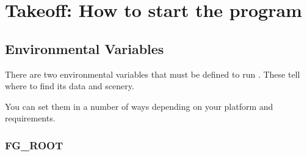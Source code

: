 
\chapter{Takeoff: How to start the program\label{takeoff}}


\section{Environmental Variables}

There are two environmental variables that must be defined to run \FlightGear{}.
These tell \FlightGear{} where to find its data and scenery.

You can set them in a number of ways depending on your platform and requirements. 

\subsection{FG\_ROOT}


